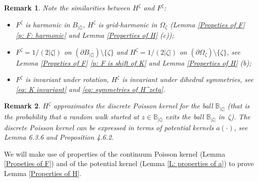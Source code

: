 \documentclass[11pt]{article}
\numberwithin{equation}{section}
\def\OZ{\Omega_{\zeta}}
\def\mydot{\boldsymbol{\cdot}}
\newtheorem*{remark}{Remark}
\begin{document}
\begin{remark}
  Note the similarities between $H^{\zeta}$ and $F^{\zeta}$: 
  \begin{itemize}
    \item $F^{\zeta}$ is harmonic in $B_{|\zeta|}$, 
      $H^{\zeta}$ is grid-harmonic in $\OZ$ 
      (Lemma \ref{Propeties of F} \ref{p: F: harmonic} and Lemma \ref{Properties of H} (c));
    \item $F^{\zeta} = 1/(2|\zeta|)$ on $(\partial B_{|\zeta|}) \setminus \{\zeta\}$ and 
      $H^{\zeta} = 1/(2|\zeta|)$ on $(\partial \OZ) \setminus \{\zeta\}$, 
      see Lemma \ref{Propeties of F} \ref{p: F is shift of K} and Lemma \ref{Properties of H} (b); 
    \item $F^{\zeta}$ is invariant under rotation, 
      $H^{\zeta}$ is invariant under dihedral symmetries, see
      \eqref{eq: K invariant} and \eqref{eq: symmetries of H^zeta}. 
  \end{itemize}
\end{remark}

\begin{remark}
  $H^{\zeta}$ approximates the discrete Poisson kernel for the ball $\mathbb{B}_{|\zeta|}$  
  (that is the probability that a random walk started at $z \in \mathbb{B}_{|\zeta|}$ 
  exits the ball $\mathbb{B}_{|\zeta|}$ \hbox{in $\zeta$).} 
  The discrete Poisson kernel can be expressed in terms of potential kernels 
  $a(\mydot)$, see \cite{lawler} Lemma 6.3.6 and Proposition 4.6.2.
\end{remark}

We will make use of properties of the continuum Poisson kernel 
(Lemma \ref{Propeties of F}) and of the potential kernel 
(Lemma \ref{L: properties of a}) to prove Lemma \ref{Properties of H}. 
\end{document}
